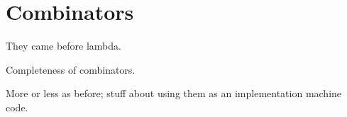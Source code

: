 \chapter{Combinators}

They came before lambda.

Completeness of combinators.

More or less as before; stuff about using them as an implementation machine
code.

